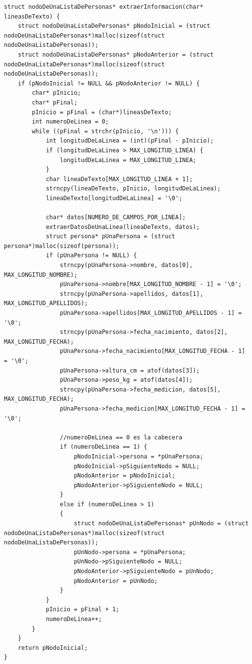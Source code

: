 \documentclass[spanish,12pt,a4paper,final,oneside]{book}
\begin{document}
\begin{lstlisting}[frame=single, caption=lenguaje c]
struct nodoDeUnaListaDePersonas* extraerInformacion(char* lineasDeTexto) {
    struct nodoDeUnaListaDePersonas* pNodoInicial = (struct nodoDeUnaListaDePersonas*)malloc(sizeof(struct nodoDeUnaListaDePersonas));
    struct nodoDeUnaListaDePersonas* pNodoAnterior = (struct nodoDeUnaListaDePersonas*)malloc(sizeof(struct nodoDeUnaListaDePersonas));
    if (pNodoInicial != NULL && pNodoAnterior != NULL) {
        char* pInicio;
        char* pFinal;
        pInicio = pFinal = (char*)lineasDeTexto;
        int numeroDeLinea = 0;
        while ((pFinal = strchr(pInicio, '\n'))) {
            int longitudDeLaLinea = (int)(pFinal - pInicio);
            if (longitudDeLaLinea > MAX_LONGITUD_LINEA) {
                longitudDeLaLinea = MAX_LONGITUD_LINEA;
            }
            char lineaDeTexto[MAX_LONGITUD_LINEA + 1];
            strncpy(lineaDeTexto, pInicio, longitudDeLaLinea);
            lineaDeTexto[longitudDeLaLinea] = '\0';

            char* datos[NUMERO_DE_CAMPOS_POR_LINEA];
            extraerDatosDeUnaLinea(lineaDeTexto, datos);
            struct persona* pUnaPersona = (struct persona*)malloc(sizeof(persona));
            if (pUnaPersona != NULL) {
                strncpy(pUnaPersona->nombre, datos[0], MAX_LONGITUD_NOMBRE);
                pUnaPersona->nombre[MAX_LONGITUD_NOMBRE - 1] = '\0';
                strncpy(pUnaPersona->apellidos, datos[1], MAX_LONGITUD_APELLIDOS);
                pUnaPersona->apellidos[MAX_LONGITUD_APELLIDOS - 1] = '\0';
                strncpy(pUnaPersona->fecha_nacimiento, datos[2], MAX_LONGITUD_FECHA);
                pUnaPersona->fecha_nacimiento[MAX_LONGITUD_FECHA - 1] = '\0';
                pUnaPersona->altura_cm = atof(datos[3]);
                pUnaPersona->peso_kg = atof(datos[4]);
                strncpy(pUnaPersona->fecha_medicion, datos[5], MAX_LONGITUD_FECHA);
                pUnaPersona->fecha_medicion[MAX_LONGITUD_FECHA - 1] = '\0';

                //numeroDeLinea == 0 es la cabecera
                if (numeroDeLinea == 1) {
                    pNodoInicial->persona = *pUnaPersona;
                    pNodoInicial->pSiguienteNodo = NULL;
                    pNodoAnterior = pNodoInicial;
                    pNodoAnterior->pSiguienteNodo = NULL;
                }
                else if (numeroDeLinea > 1)
                {
                    struct nodoDeUnaListaDePersonas* pUnNodo = (struct nodoDeUnaListaDePersonas*)malloc(sizeof(struct nodoDeUnaListaDePersonas));
                    pUnNodo->persona = *pUnaPersona;
                    pUnNodo->pSiguienteNodo = NULL;
                    pNodoAnterior->pSiguienteNodo = pUnNodo;
                    pNodoAnterior = pUnNodo;
                }
            }
            pInicio = pFinal + 1;
            numeroDeLinea++;
        }
    }
    return pNodoInicial;
}






\end{lstlisting}
\end{document}
